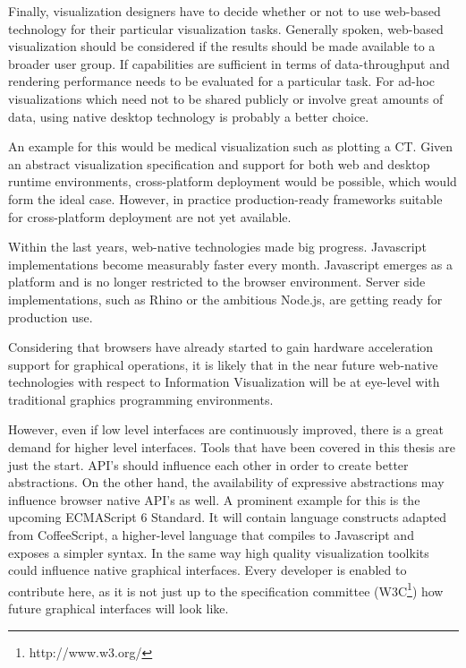 Finally, visualization designers have to decide whether or not to use web-based technology for their particular visualization tasks. Generally spoken, web-based visualization should be considered if the results should be made available to a broader user group. If capabilities are sufficient in terms of data-throughput and rendering performance needs to be evaluated for a particular task. For ad-hoc visualizations which need not to be shared publicly or involve great amounts of data, using native desktop technology is probably a better choice.

 An example for this would be medical visualization such as plotting a CT. Given an abstract visualization specification and support for both web and desktop runtime environments, cross-platform deployment would be possible, which would form the ideal case. However, in practice production-ready frameworks suitable for cross-platform deployment are not yet available.

\SuperPar Within the last years, web-native technologies made big progress. Javascript implementations become measurably faster every month. Javascript emerges as a platform and is no longer restricted to the browser environment. Server side implementations, such as Rhino or the ambitious Node.js, are getting ready for production use.

Considering that browsers have already started to gain hardware acceleration support for graphical operations, it is likely that in the near future web-native technologies with respect to Information Visualization will be at eye-level with traditional graphics programming environments.

However, even if low level interfaces are continuously improved, there is a great demand for higher level interfaces. Tools that have been covered in this thesis are just the start. API's should influence each other in order to create better abstractions. On the other hand, the availability of expressive abstractions may influence browser native API's as well. A prominent example for this is the upcoming ECMAScript 6 Standard. It will contain language constructs adapted from CoffeeScript, a higher-level language that compiles to Javascript and exposes a simpler syntax. In the same way high quality visualization toolkits could influence native graphical interfaces. Every developer is enabled to contribute here, as it is not just up to the specification committee (W3C\footnote{http://www.w3.org/}) how future graphical interfaces will look like.

